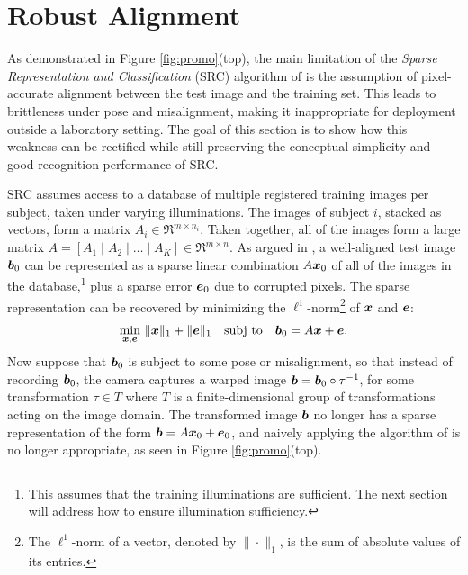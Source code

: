 \section{Robust Alignment}\label{sec:registration} As demonstrated in Figure
\ref{fig:promo}(top), the main limitation of the {\em Sparse Representation and
Classification} (SRC) algorithm of \cite{Wright2009-PAMI} is the assumption of
pixel-accurate alignment between the test image and the training set. This
leads to brittleness under pose and misalignment, making it inappropriate for
deployment outside a laboratory setting. The goal of this section is to show
how this weakness can be rectified while still preserving the conceptual
simplicity and good recognition performance of SRC.

SRC assumes access to a database of multiple registered
training images per subject, taken under varying illuminations.
The images of subject $i$, stacked as vectors, form a matrix
$A_i \in \Re^{m \times n_i}$. Taken together, all of the images
form a large matrix $A = [ A_1 \mid A_2 \mid \dots \mid A_K ]
\in \Re^{m \times n}$. As argued in \cite{Wright2009-PAMI}, a
well-aligned test image $\boldsymbol{b}_0$ can be represented as a sparse
linear combination $A {\boldsymbol{x}}_0$ of all of the images in the
database,\footnote{This assumes that the training illuminations are sufficient. The next section will address how to ensure illumination
sufficiency.} plus a sparse error $\boldsymbol{e}_0$
due to corrupted pixels. The sparse representation can be recovered by
minimizing the $\ell^1$-norm\footnote{The $\ell^1$-norm of a
vector, denoted by $\|\cdot\|_1$, is the sum of absolute values of its entries.} of
${\boldsymbol{x}}$ and $\boldsymbol{e}$:
\begin{equation}
\min_{{\boldsymbol{x}},\boldsymbol{e}} \, \| {\boldsymbol{x}} \|_1 + \| \boldsymbol{e}\|_1 \quad \textup{subj to} \quad \boldsymbol{b}_0 = A {\boldsymbol{x}} + \boldsymbol{e}.
\label{eqn:robust-l1}
\end{equation}
Now suppose that $\boldsymbol{b}_0$ is subject to some pose or
misalignment, so that instead of recording $\boldsymbol{b}_0$, the camera captures
a warped image $\boldsymbol{b} = \boldsymbol{b}_0 \circ \tau^{-1}$, for some
transformation $\tau \in T$ where $T$ is a finite-dimensional
group of transformations acting on the image domain.  The
transformed image $\boldsymbol{b}$ no longer has a sparse representation of
the form $\boldsymbol{b} = A {\boldsymbol{x}}_0 + \boldsymbol{e}_0$, and naively applying the
algorithm of \cite{Wright2009-PAMI} is no longer appropriate,
as seen in Figure \ref{fig:promo}(top).

